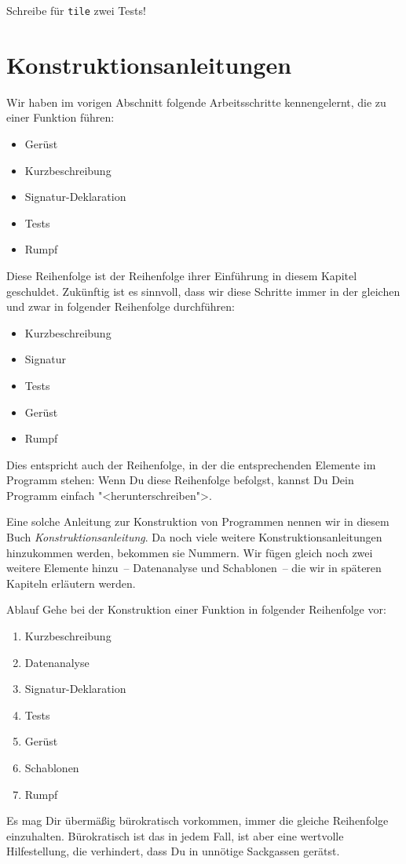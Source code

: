 \begin{aufgabe}
  Schreibe für \texttt{tile} zwei Tests!
\end{aufgabe}

\section{Konstruktionsanleitungen}
\label{sec:konstruktionsanleitungen}
%
Wir haben im vorigen Abschnitt folgende Arbeitsschritte kennengelernt,
die zu einer Funktion führen:
%
\begin{itemize}
\item Gerüst
\item Kurzbeschreibung
\item Signatur-Deklaration
\item Tests
\item Rumpf
\end{itemize}
%
Diese Reihenfolge ist der Reihenfolge ihrer Einführung in diesem
Kapitel geschuldet.  Zukünftig ist es sinnvoll, dass wir diese Schritte
immer in der gleichen und zwar in folgender Reihenfolge durchführen:
%
\begin{itemize}
\item Kurzbeschreibung
\item Signatur
\item Tests
\item Gerüst
\item Rumpf
\end{itemize}
%
Dies entspricht auch der Reihenfolge, in der die entsprechenden
Elemente im Programm stehen: Wenn Du diese Reihenfolge befolgst,
kannst Du Dein Programm einfach "<herunterschreiben">.

Eine solche Anleitung zur Konstruktion von Programmen nennen wir in
diesem Buch
\textit{Konstruktionsanleitung}.  Da
noch viele weitere Konstruktionsanleitungen hinzukommen werden,
bekommen sie Nummern.  Wir fügen gleich noch zwei weitere Elemente
hinzu~-- Datenanalyse und Schablonen~-- die wir in späteren Kapiteln
erläutern werden.

\begin{konstruktionsanleitung}{Ablauf}
  Gehe bei der Konstruktion einer Funktion in folgender Reihenfolge
  vor:
  \begin{enumerate}
    \item Kurzbeschreibung
    \item Datenanalyse
    \item Signatur-Deklaration
    \item Tests
    \item Gerüst
    \item Schablonen
    \item Rumpf
    \end{enumerate}
\end{konstruktionsanleitung}
%
Es mag Dir übermäßig bürokratisch vorkommen, immer die gleiche
Reihenfolge einzuhalten.  Bürokratisch ist das in jedem Fall, ist aber
eine wertvolle Hilfestellung, die verhindert, dass Du in unnötige
Sackgassen gerätst.

